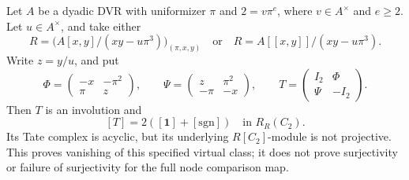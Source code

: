 \begin{proposition}
\label{C:ramified-A2-MF-cancellation}
Let $A$ be a dyadic DVR with uniformizer $\pi$ and
$2=v\pi^e$, where $v\in A^\times$ and $e\geq2$.
Let $u\in A^\times$, and take either
\[
 R=\bigl(A[x,y]/(xy-u\pi^3)\bigr)_{(\pi,x,y)}
 \quad\text{or}\quad
 R=A[[x,y]]/(xy-u\pi^3).
\]
Write $z=y/u$, and put
\[
 \Phi=\begin{pmatrix}-x&-\pi^2\\\pi&z\end{pmatrix},
 \qquad
 \Psi=\begin{pmatrix}z&\pi^2\\-\pi&-x\end{pmatrix},
 \qquad
 T=\begin{pmatrix}I_2&\Phi\\\Psi&-I_2\end{pmatrix}.
                                                               \tag{C.1.MF3}
\]
Then $T$ is an involution and
\[
                    [T]=2([\mathbf1]+[\mathrm{sgn}])
                    \quad\text{in }R_R(C_2).          \tag{C.1.MF4}
\]
Its Tate complex is acyclic, but its underlying
$R[C_2]$-module is not projective.
This proves vanishing of this specified virtual class;
it does not prove surjectivity or failure of surjectivity
for the full node comparison map.
\end{proposition}
